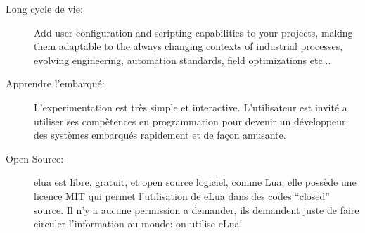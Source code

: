 \begin{description}
 \item[Long cycle de vie:]  Add user configuration and scripting capabilities to your projects, making them adaptable to the always changing contexts of industrial processes, evolving engineering, automation standards, field optimizations etc...

 \item[Apprendre l'embarqué: ] L'experimentation est très simple et interactive. L'utilisateur est invité a utiliser ses compètences en programmation
pour devenir un développeur des systèmes embarqués rapidement et de façon amusante.

 \item[Open Source:] elua est libre, gratuit, et open source logiciel, comme Lua, elle possède une licence MIT qui permet l'utilisation de eLua dans des 
codes ``closed'' source. Il n'y a aucune permission a demander, ils demandent juste de faire circuler l'information au monde: on utilise eLua!
\end{description}





